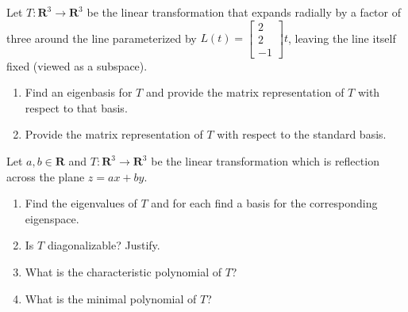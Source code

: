 \documentclass[11pt,twoside,openany]{memoir}
\begin{document}
        \begin{exercise}
        Let $T:\mathbf{R}^3\to \mathbf{R}^3$ be the linear transformation that expands radially by a factor of three around the line parameterized by $L(t)=\begin{bmatrix} 2 \\ 2 \\ -1\end{bmatrix} t$, leaving the line itself fixed (viewed as a subspace).
        \begin{enumerate}[label = (\arabic*)]
            \item Find an eigenbasis for $T$ and provide the matrix representation of $T$ with respect to that basis.
            \item Provide the matrix representation of $T$ with respect to the standard basis.
        \end{enumerate}
        \end{exercise}
        
        \begin{exercise}
        Let $a,b\in \mathbf{R}$ and $T:\mathbf{R}^3\to \mathbf{R}^3$ be the linear transformation which is reflection across the plane $z=ax+by$.
        \begin{enumerate}[label = (\arabic*)]
            \item Find the eigenvalues of $T$ and for each find a basis for the corresponding eigenspace.
            \item Is $T$ diagonalizable? Justify.
            \item What is the characteristic polynomial of $T$?
            \item What is the minimal polynomial of $T$?
        \end{enumerate}
        \end{exercise}

\end{document}

